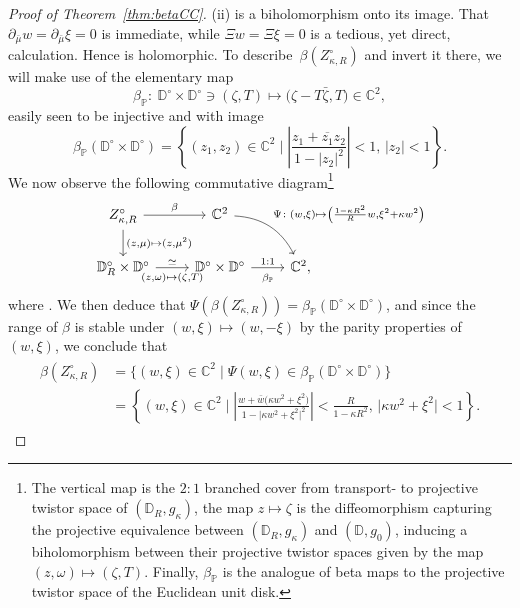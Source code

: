 \documentclass[pdftex]{sigma}
\numberwithin{equation}{section}
\theoremstyle{definition}
\newcommand{\1}{{\bf 1}}
\newcommand \Cm { \mathbb{C}}
\newcommand \Dm { \mathbb{D}}
\newcommand \zbar { \bar{z}}
\newcommand \mubar {{\bar{\mu}}}
\begin{document}
\begin{proof}[Proof of Theorem~\ref{thm:betaCC}]
(ii)  is a biholomorphism onto its image. That $\partial_{\mubar} w = \partial_{\mubar} \xi = 0$ is immediate, while $\Xi w = \Xi \xi = 0$ is a tedious, yet direct, calculation. Hence  is holomorphic. To describe~$\beta(Z_{\kappa,R}^\circ)$ and invert it there, we will make use of the elementary map
	\[ \beta_{\mathbb{P}} \colon \ \Dm^\circ\times \Dm^\circ\ni (\zeta,T) \mapsto \bigl(\zeta-T\bar{\zeta}, T\bigr) \in \Cm^2, \]
	easily seen to be injective and with image
	\[ \beta_{\mathbb{P}} (\Dm^\circ\times \Dm^\circ) = \left\{ (z_1,z_2) \in \Cm^2 \mid \left| \frac{z_1 + \overline{z_1}z_2}{1-|z_2|^2}\right| <1,\, |z_2|<1 \right\}. \]
	We now observe the following commutative diagram\footnote{The vertical map is the $2:1$ branched cover from transport- to projective twistor space of $(\Dm_R,g_\kappa)$, the map $z\mapsto \zeta$ is the diffeomorphism capturing the projective equivalence between $(\Dm_R,g_\kappa)$ and $(\Dm,g_0)$, inducing a biholomorphism between their projective twistor spaces given by the map $(z,\omega)\mapsto (\zeta,T)$. Finally, $\beta_{\mathbb{P}}$ is the analogue of beta maps to the projective twistor space of the Euclidean unit disk.}
	\[
	 	\begin{tikzcd}
			Z_{\kappa,R}^\circ \arrow["{\beta}"]{r} \arrow["{(z,\mu)\mapsto (z,\mu^2)}"]{d} & \Cm^2 \arrow[dr, bend left, "{\Psi\colon (w,\xi)\mapsto \bigl(\frac{1-\kappa R^2}{R}w, \xi^2 + \kappa w^2\bigr)}"] & {} \\
	 		\Dm_R^\circ \times \Dm^\circ \arrow[r, "\simeq", "{(z,\omega)\mapsto (\zeta,T)}"{yshift=-3ex}] & \Dm^\circ \times \Dm^\circ \arrow[r, "1:1", "{\beta_{\mathbb{P}}}"{yshift=-3ex}] & \Cm^2,
	 	\end{tikzcd}
	\]
	where \smash{$(\zeta,T) = \bigl(\frac{1-\kappa R^2}{1-\kappa |z|^2} \frac{z}{R}, \frac{\kappa z^2 + \omega}{1+\kappa\zbar^2 \omega}\bigr)$}. We then deduce that $\Psi(\beta(Z_{\kappa,R}^\circ)) = \beta_{\mathbb{P}}(\Dm^\circ\times \Dm^\circ)$, and since the range of $\beta$ is stable under $(w,\xi)\mapsto (w,-\xi)$ by the parity properties of $(w,\xi)$, we conclude that
	\begin{align*}
		\begin{split}
			\beta(Z_{\kappa,R}^\circ) &= \big\{(w,\xi)\in \Cm^2 \mid \Psi(w,\xi)\in \beta_{\mathbb{P}} (\Dm^\circ\times \Dm^\circ)\big\}	 \\
			&= \left\{ (w,\xi)\in \Cm^2 \mid \left|\frac{w+\bar{w}\bigl(\kappa w^2 + \xi^2\bigr)}{1-\big|\kappa w^2 + \xi^2\big|^2}\right| < \frac{R}{1-\kappa R^2}, \, \big|\kappa w^2 + \xi^2\big|<1 \right\}.

\end{split}
\end{align*}
\end{proof}
\end{document}
